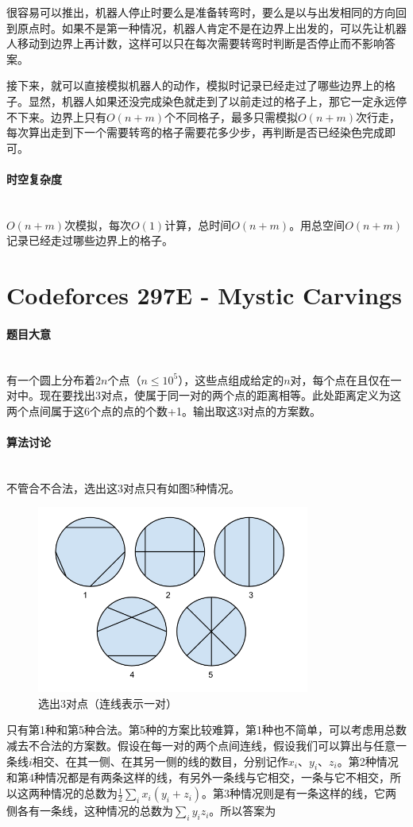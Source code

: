 \documentclass[UTF8]{ctexart}
\newcommand{\myparagraph}[1]{\paragraph{#1}\mbox{}\\}
\theoremstyle{nonumberplain}
\begin{document}
			很容易可以推出，机器人停止时要么是准备转弯时，要么是以与出发相同的方向回到原点时。如果不是第一种情况，机器人肯定不是在边界上出发的，可以先让机器人移动到边界上再计数，这样可以只在每次需要转弯时判断是否停止而不影响答案。
			
			接下来，就可以直接模拟机器人的动作，模拟时记录已经走过了哪些边界上的格子。显然，机器人如果还没完成染色就走到了以前走过的格子上，那它一定永远停不下来。边界上只有$O(n+m)$个不同格子，最多只需模拟$O(n+m)$次行走，每次算出走到下一个需要转弯的格子需要花多少步，再判断是否已经染色完成即可。
			
		\myparagraph{时空复杂度}
		
			$O(n+m)$次模拟，每次$O(1)$计算，总时间$O(n+m)$。用总空间$O(n+m)$记录已经走过哪些边界上的格子。
	
	\section{Codeforces 297E - Mystic Carvings}
	
		\myparagraph{题目大意}
		
			有一个圆上分布着$2n$个点（$n \leq 10^5$），这些点组成给定的$n$对，每个点在且仅在一对中。现在要找出3对点，使属于同一对的两个点的距离相等。此处距离定义为这两个点间属于这6个点的点的个数+1。输出取这3对点的方案数。
		
		\myparagraph{算法讨论}
		
			不管合不合法，选出这3对点只有如图5种情况。
			
			\begin{figure}[ht]
				\centering
				\includegraphics[width=0.8\textwidth]{fig297e_1.png}
				\caption{选出3对点（连线表示一对）}
			\end{figure}
			
			只有第1种和第5种合法。第5种的方案比较难算，第1种也不简单，可以考虑用总数减去不合法的方案数。假设在每一对的两个点间连线，假设我们可以算出与任意一条线$i$相交、在其一侧、在其另一侧的线的数目，分别记作$x_i$、$y_i$、$z_i$。第2种情况和第4种情况都是有两条这样的线，有另外一条线与它相交，一条与它不相交，所以这两种情况的总数为$\frac{1}{2}\sum_i x_i(y_i+z_i)$。第3种情况则是有一条这样的线，它两侧各有一条线，这种情况的总数为$\sum_i y_i z_i$。所以答案为
			
\end{document}
